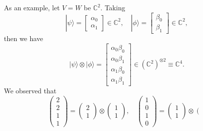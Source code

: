 \begin{example}
    As an example, let $V = W$ be $\mathbb{C}^2$. Taking
    \begin{equation}
    |\psi\rangle=\left[\begin{array}{l}
    \alpha_0 \\
    \alpha_1
    \end{array}\right] \in \mathbb{C}^2, \quad
    |\phi\rangle=\left[\begin{array}{l}
    \beta_0 \\
    \beta_1
    \end{array}\right] \in \mathbb{C}^2,
\end{equation}
    then we have
    \begin{equation}
    \label{eq_tensor}
        |\psi\rangle \otimes|\phi\rangle=\left[\begin{array}{l}
        \alpha_0\beta_0 \\
        \alpha_0\beta_1 \\
        \alpha_1\beta_0 \\
        \alpha_1\beta_1
        \end{array}\right] \in\left(\mathbb{C}^2\right)^{\otimes 2} \equiv \mathbb{C}^4.
\end{equation}
    We observed that
    \begin{equation}
    \left(\begin{array}{l}
    2 \\
    2 \\
    1 \\
    1
    \end{array}\right)=\left(\begin{array}{l}
    2 \\
    1
    \end{array}\right) \otimes\left(\begin{array}{l}
    1 \\
    1
    \end{array}\right)
    , \quad
    \left(\begin{array}{l}
    1 \\
    0 \\
    1 \\
    0
    \end{array}\right)=\left(\begin{array}{l}
    1 \\
    1
    \end{array}\right) \otimes\left(\begin{array}{l}

\end{array}
\end{equation}
\end{example}
